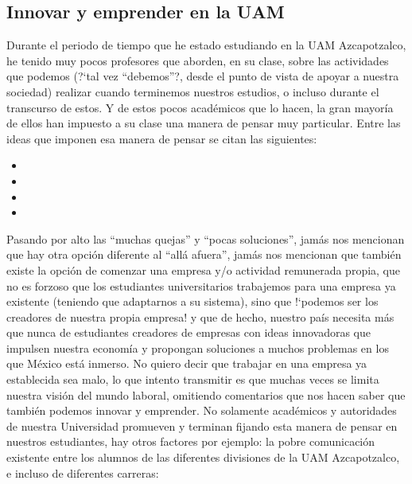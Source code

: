 \documentclass[11pt,letterpaper,titlepage]{article}
\begin{document}
\subsection{Innovar y emprender en la UAM}

Durante el periodo de tiempo que he estado estudiando en la UAM Azcapotzalco, he tenido muy pocos profesores que aborden, en su clase, sobre las actividades que podemos (?`tal vez ``debemos''?, desde el punto de vista de apoyar a nuestra sociedad) realizar cuando terminemos nuestros estudios, o incluso durante el transcurso de estos. Y de estos pocos acad\'emicos que lo hacen, la gran mayor\'ia de ellos han impuesto a su clase una manera de pensar muy particular. Entre las ideas que imponen esa manera de pensar se citan las siguientes:
\begin{itemize}
 \item {}\frqq
 \item {} \frqq
 \item {}\frqq
\item {}\frqq
\end{itemize}
 

Pasando por alto las ``muchas quejas'' y ``pocas soluciones'', jam\'as nos mencionan que hay otra opci\'on diferente al ``all\'a afuera'', jam\'as nos mencionan que tambi\'en existe la opci\'on de comenzar una empresa y/o actividad remunerada propia, que no es forzoso que los estudiantes universitarios trabajemos para una empresa ya existente (teniendo que adaptarnos a su sistema), sino que !`podemos ser los creadores de nuestra propia empresa! y que de hecho, nuestro pa\'is necesita m\'as que nunca de estudiantes creadores de empresas con ideas innovadoras que impulsen nuestra econom\'ia y propongan soluciones a muchos problemas en los que M\'exico est\'a inmerso. No quiero decir que trabajar en una empresa ya establecida sea malo, lo que intento transmitir es que muchas veces se limita nuestra visi\'on del mundo laboral, omitiendo comentarios que nos hacen saber que tambi\'en podemos innovar y emprender. No solamente acad\'emicos y autoridades de nuestra Universidad promueven y terminan fijando esta manera de pensar en nuestros estudiantes, hay otros factores por ejemplo: la pobre comunicaci\'on existente entre los alumnos de las diferentes divisiones de la UAM Azcapotzalco, e incluso de diferentes carreras:
\end{document}
